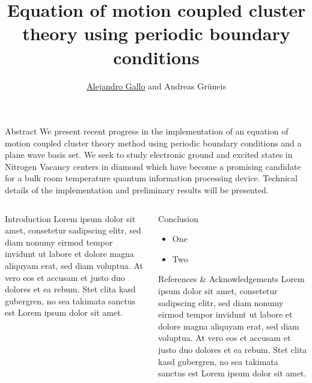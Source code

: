 \documentclass[final]{beamer}
\title{
  Equation of motion coupled cluster theory using periodic boundary conditions
}
\author{\underline{Alejandro Gallo} and Andreas Gr\"uneis}
\institute[]{
  Technical University of Vienna
}
\begin{document}
\begin{frame}[fragile]{}

  \begin{block}{\large Abstract}
    We present recent progress in the implementation of an equation of motion
    coupled cluster theory method using periodic boundary conditions and a plane
    wave basis set.  We seek to study electronic ground and excited states in
    Nitrogen Vacancy centers in diamond which have become a promising candidate
    for a bulk room temperature quantum information processing device. Technical
    details of the implementation and preliminary results will be presented.
  \end{block}
  \begin{columns}[T]
    \begin{column}{.49\linewidth}
      \begin{block}{\large Introduction}
        Lorem ipsum dolor sit amet, consetetur sadipscing elitr, sed diam nonumy
        eirmod tempor invidunt ut labore et dolore magna aliquyam erat, sed diam
        voluptua. At vero eos et accusam et justo duo dolores et ea rebum. Stet
        clita kasd gubergren, no sea takimata sanctus est Lorem ipsum dolor sit
        amet.
      \end{block}

    \end{column}


    \begin{column}{.49\linewidth}

      \begin{block}{\large Conclusion}
        \begin{itemize}
          \item
            One
          \item
            Two
        \end{itemize}
      \end{block}

      \begin{block}{\large References \& Acknowledgements}
        Lorem ipsum dolor sit amet, consetetur sadipscing elitr, sed diam nonumy
        eirmod tempor invidunt ut labore et dolore magna aliquyam erat, sed diam
        voluptua. At vero eos et accusam et justo duo dolores et ea rebum. Stet
        clita kasd gubergren, no sea takimata sanctus est Lorem ipsum dolor sit
        amet.
      \end{block}

    \end{column}

  \end{columns}

\end{frame}
\end{document}
